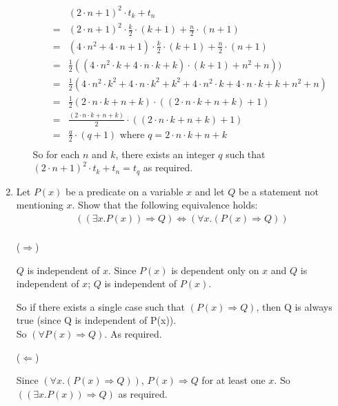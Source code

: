 \documentclass[10pt,\jkfside,a4paper]{article}
\begin{document}
\begin{enumerate}
\begin{itemize}
\begin{equation}
\begin{split}
&(2\cdot n + 1)^2\cdot t_k+t_n\\
=& (2\cdot n + 1)^2\cdot \frac{k}{2}\cdot(k + 1) + \frac{n}{2}\cdot(n + 1)\\
=& (4\cdot n^2 + 4\cdot n + 1)\cdot \frac{k}{2}\cdot(k + 1) + \frac{n}{2}\cdot(n + 1)\\
=& \frac{1}{2}((4\cdot n^2\cdot k + 4\cdot n \cdot k + k)\cdot(k + 1) + n^2 + n))\\
=& \frac{1}{2}(4\cdot n^2\cdot k^2 + 4\cdot n \cdot k^2 + k^2 + 4\cdot n^2\cdot k + 4\cdot n \cdot k + k + n^2 + n)\\
=& \frac{1}{2}(2\cdot n \cdot k + n + k)\cdot((2\cdot n \cdot k + n + k) + 1)\\
=& \frac{(2\cdot n \cdot k + n + k)}{2}\cdot((2\cdot n \cdot k + n + k) + 1)\\
=& \frac{q}{2}\cdot(q + 1) \text{ where } q = 2\cdot n \cdot k + n + k\\
\end{split}
\end{equation}
So for each $n$ and $k$, there exists an integer $q$ such that $(2\cdot n + 1)^2\cdot t_k+t_n=t_q$ as required.

\end{itemize}

\item Let $P(x)$ be a predicate on a variable $x$ and let $Q$ be a statement not mentioning $x$. Show that 
the following equivalence holds:
\begin{equation}
\begin{split}
((\exists x. P(x))\Longrightarrow Q)\Longleftrightarrow(\forall x.(P(x)\Longrightarrow Q))\\
\end{split}
\end{equation}

($\Longrightarrow$)

$Q$ is independent of $x$. Since $P(x)$ is dependent only on $x$ and $Q$ is independent 
of $x$; $Q$ is independent of $P(x)$.

So if there exists a single case such that $(P(x) \Longrightarrow Q)$, then Q is always true 
(since Q is independent of P(x)).\\
So $(\forall P(x) \Longrightarrow Q)$. As required.

($\Longleftarrow$)

Since $(\forall x.(P(x)\Longrightarrow Q))$, $P(x)\Longrightarrow Q$ for at least one $x$. 
So $((\exists x. P(x))\Longrightarrow Q)$ as required.

\end{enumerate}
\end{document}
